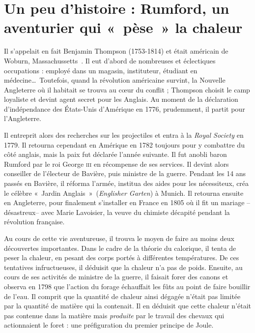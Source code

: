 \atstartofhistorysection
\section[Un peu d’histoire : l’aventurier Rumford]{Un peu d’histoire :\onlyamphibook{\\} Rumford, un aventurier qui «~pèse~» la chaleur}
\label{ch_histoire_rumford_depondt}


	Il s'appelait en fait Benjamin Thompson (1753-1814) et était américain de Woburn, Massachussetts~\cite{millar1996}. Il eut d'abord de nombreuses et éclectiques occupations : employé dans un magasin, instituteur, étudiant en médecine…\ Toutefois, quand la révolution américaine survint, la Nouvelle Angleterre où il habitait se trouva au cœur du conflit ; Thompson choisit le camp loyaliste et devint agent secret pour les Anglais. Au moment de la déclaration d'indépendance des États-Unis d'Amérique en 1776, prudemment, il partit pour l'Angleterre.

	Il entreprit alors des recherches sur les projectiles et entra à la \textit{Royal Society} en 1779. Il retourna cependant en Amérique en 1782 toujours pour y combattre du côté anglais, mais la paix fut déclarée l'année suivante. Il fut anobli baron Rumford par le roi George \textsc{iii} en récompense de ses services. Il devint alors conseiller de l'électeur de Bavière, puis ministre de la guerre. Pendant les 14 ans passés en Bavière, il réforma l'armée, institua des aides pour les nécessiteux, créa le célèbre «~Jardin Anglais~»\ (\textit{Englisher Garten}) à Munich. Il retourna ensuite en Angleterre, pour finalement s'installer en France en 1805 où il fit un mariage --désastreux-- avec Marie Lavoisier, la veuve du chimiste décapité pendant la révolution française.

	Au cours de cette vie aventureuse, il trouva le moyen de faire au moins deux découvertes importantes. Dans le cadre de la théorie du calorique, il tenta de peser la chaleur, en pesant des corps portés à différentes températures. De ces tentatives infructueuses, il déduisit que la chaleur n'a pas de poids. Ensuite, au cours de ses activités de ministre de la guerre, il faisait forer des canons et observa en 1798 que l'action du forage échauffait les fûts au point de faire bouillir de l'eau. Il comprit que la quantité de chaleur ainsi dégagée n'était pas limitée par la quantité de matière qui la contenait. Il en déduisit que cette chaleur n'était pas contenue dans la matière mais \emph{produite} par le travail des chevaux qui actionnaient le foret : une préfiguration du premier principe de Joule.

